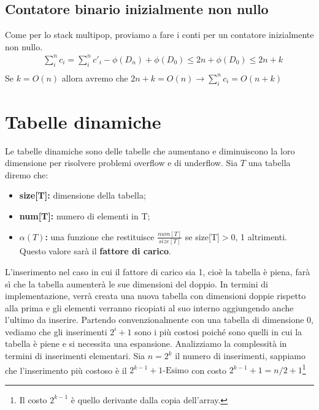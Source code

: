\subsection{Contatore binario inizialmente non nullo}
Come per lo stack multipop, proviamo a fare i conti per un contatore inizialmente non nullo. 
\begin{align*}
    &\sum_i^nc_i = \sum_i^nc'_i - \phi(D_n)+\phi(D_0) \leq 2n+\phi(D_0) \leq 2n+k \\
\end{align*}
Se $k=O(n)$ allora avremo che $2n+k=O(n) \xrightarrow{}\sum_i^n c_i = O(n+k)$

\section{Tabelle dinamiche}
Le tabelle dinamiche sono delle tabelle che aumentano e diminuiscono la loro dimensione per risolvere problemi overflow e di underflow. Sia $T$ una tabella diremo che:
\begin{itemize}
    \item \textbf{size[T]:} dimensione della tabella;
    \item \textbf{num[T]:} numero di elementi in T;
    \item \textbf{$\alpha(T)$:} una funzione che restituisce $\frac{num[T]}{size[T]}$ se size[T]$>$0, 1 altrimenti. Questo valore sarà il \textbf{fattore di carico}.
\end{itemize} 

L'inserimento nel caso in cui il fattore di carico sia 1, cioè la tabella è piena, farà sì che la tabella aumenterà le sue dimensioni del doppio. In termini di implementazione, verrà creata una nuova tabella con dimensioni doppie rispetto alla prima e gli elementi verranno ricopiati al suo interno aggiungendo anche l'ultimo da inserire. Partendo convenzionalmente con una tabella di dimensione 0, vediamo che gli inserimenti $2^i+1$ sono i più costosi poiché sono quelli in cui la tabella è piene e si necessita una espansione. 
Analizziamo la complessità in termini di inserimenti elementari. Sia $n=2^k$ il numero di inserimenti, sappiamo che l'inserimento più costoso è il $2^{k-1}+1\text{-Esimo}$ con costo $2^{k-1}+1 = n/2+1$\footnote{Il costo $2^{k-1}$ è quello derivante dalla copia dell'array.}
